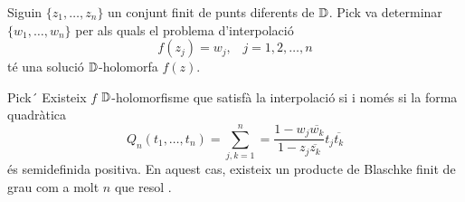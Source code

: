 \documentclass[dvipsnames, svgnames, leqno, a4paper, 12pt]{report}
\begin{document}
Siguin $\{z_1,\dots,z_n\}$ un conjunt finit de punts diferents de $\mathbb{D}$. Pick va determinar  $\{w_1,\dots,w_n\}$ per als quals el problema d'interpolació
\begin{equation}\label{eq:interpol}
    f(z_j)=w_j,\, \text{  } j=1,2,\dots,n
\end{equation}
té una solució $\mathbb{D}$-holomorfa $f(z)$.
\begin{theorem}{Pick}´
    Existeix $f$ $\mathbb{D}$-holomorfisme que satisfà la interpolació \normalfont{(\ref{eq:interpol})} si i només si la forma quadràtica \begin{displaymath}
        Q_n(t_1,\dots,t_n)=\sum_{j,k=1}^n=\frac{1-w_j\overline{w_k}}{1-z_j\overline{z_k}}t_j\overline{t_k}
    \end{displaymath}
    és semidefinida positiva. En aquest cas, existeix un producte de Blaschke finit de grau com a molt $n$ que resol \normalfont{(\ref{eq:interpol})}.
\end{theorem}
\end{document}
